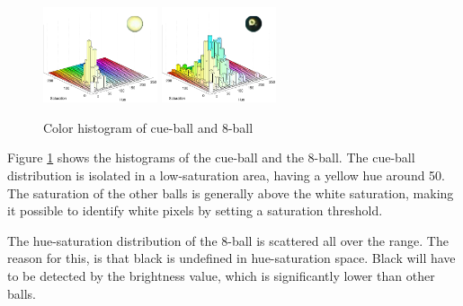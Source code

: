 \begin{figure}[H]
\centering
\subfloat
{
	\includegraphics[width=0.3\textwidth]{images/ballhist/0}
}
\subfloat
{
	\includegraphics[width=0.3\textwidth]{images/ballhist/8}
}
\caption{Color histogram of cue-ball and 8-ball}
\label{fig:ballhist-cue-8}
\end{figure}
Figure \ref{fig:ballhist-cue-8} shows the histograms of the cue-ball and the 8-ball. The cue-ball distribution is isolated in a low-saturation area, having a yellow hue around 50. The saturation of the other balls is generally above the white saturation, making it possible to identify white pixels by setting a saturation threshold.

The hue-saturation distribution of the 8-ball is scattered all over the range. The reason for this, is that black is undefined in hue-saturation space. Black will have to be detected by the brightness value, which is significantly lower than other balls. 


